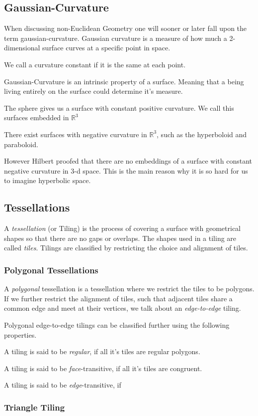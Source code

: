 \subsection{Gaussian-Curvature}\label{gaussian-curvature}

When discussing non-Euclidean Geometry one will sooner or later fall
upon the term gaussian-curvature. Gaussian curvature is a measure of how
much a 2-dimensional surface curves at a specific point in space.


We call a curvature constant if it is the same at each point.

Gaussian-Curvature is an intrinsic property of a surface. Meaning that a
being living entirely on the surface could determine it's measure.

The sphere gives us a surface with constant positive curvature. We call
this surfaces embedded in \(\mathbb{R}^3\)

There exist surfaces with negative curvature in \(\mathbb{R}^3\), such
as the hyperboloid and paraboloid.


However Hilbert proofed that there are no embeddings of a surface with
constant negative curvature in 3-d space. This is the main reason why it
is so hard for us to imagine hyperbolic space.

\subsection{Tessellations}\label{tessellations}

A \emph{tessellation} (or Tiling) is the process of covering a surface
with geometrical shapes so that there are no gaps or overlaps. The
shapes used in a tiling are called \emph{tiles}. Tilings are classified
by restricting the choice and alignment of tiles.

\subsubsection{Polygonal Tessellations}\label{polygonal-tessellations}

A \emph{polygonal} tessellation is a tessellation where we restrict the
tiles to be polygons. If we further restrict the alignment of tiles,
such that adjacent tiles share a common edge and meet at their vertices,
we talk about an \emph{edge-to-edge} tiling.

Polygonal edge-to-edge tilings can be classified further using the
following properties.

A tiling is said to be \emph{regular}, if all it's tiles are regular
polygons.

A tiling is said to be \emph{face}-transitive, if all it's tiles are
congruent.

A tiling is said to be \emph{edge}-transitive, if

\subsubsection{Triangle Tiling}\label{triangle-tiling}
